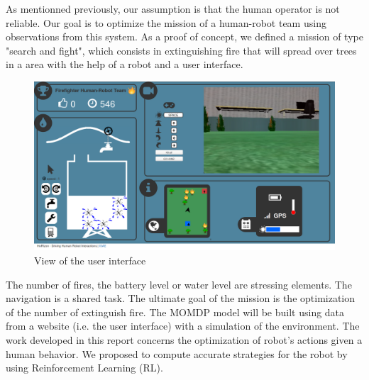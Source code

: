 \documentclass[conference]{IEEEtran}
\begin{document}
As mentionned previously, our assumption is that the human operator is not reliable.
Our goal is to optimize the mission of a human-robot team using observations from this system.
As a proof of concept, we defined a mission of type "search and fight", which consists in extinguishing fire that will spread over trees in a area with the help of a robot and a user interface.

\begin{figure}
  \includegraphics[scale = 0.13	]{images/Website.png}
  \caption{View of the user interface}
  \label{fig:my-figure}
\end{figure}

The number of fires, the battery level or water level are stressing elements. The navigation is a shared task. The ultimate goal of the mission is the optimization of the number of extinguish fire.
The MOMDP model will be built using data from a website (i.e. the user interface) with a simulation of the environment.
The work developed in this report concerns the optimization of robot's actions given a human behavior.
We proposed to compute accurate strategies for the robot by using Reinforcement Learning (RL).

\end{document}
